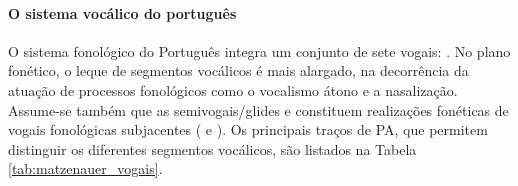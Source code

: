 \documentclass[output=paper]{LSP/langsci}
\begin{document}
\begin{table}
  \caption{Classificação dos sons consonânticos - MA, PA e vozeamento}
  \label{tab:matzenauer_consoantes}
\end{table}

\paragraph*{O sistema vocálico do português}

O sistema fonológico do Português integra um conjunto de sete vogais: . No plano fonético, o leque de segmentos vocálicos é mais alargado, na decorrência da atuação de processos fonológicos como o vocalismo átono e a nasalização. Assume-se também que as semivogais/glides \textipa{[j]} e \textipa{[w]} constituem realizações fonéticas de vogais fonológicas subjacentes ( e ). Os principais traços de PA, que permitem distinguir os diferentes segmentos vocálicos, são listados na Tabela \ref{tab:matzenauer_vogais}.
\end{document}
